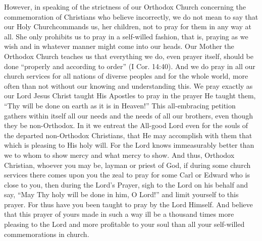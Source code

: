 However, in speaking of the strictness of our Orthodox Church concerning the commemoration of Christians who believe incorrectly, we do not mean to say that our Holy Churchcommands us, her children, not to pray for them in any way at all. She only prohibits us to pray in a self-willed fashion, that is, praying as we wish and in whatever manner might come into our heads. Our Mother the Orthodox Church teaches us that everything we do, even prayer itself, should be done ``properly and according to order'' (I Cor. 14:40). And we do pray in all our church services for all nations of diverse peoples and for the whole world, more often than not without our knowing and understanding this. We pray exactly as our Lord Jesus Christ taught His Apostles to pray in the prayer He taught them, ``Thy will be done on earth as it is in Heaven!'' This all-embracing petition gathers within itself all our needs and the needs of all our brothers, even though they be non-Orthodox. In it we entreat the All-good Lord even for the souls of the departed non-Orthodox Christians, that He may accomplish with them that which is pleasing to His holy will. For the Lord knows immeasurably better than we to whom to show mercy and what mercy to show. And thus, Orthodox Christian, whoever you may be, layman or priest of God, if during some church services there comes upon you the zeal to pray for some Carl or Edward who is close to you, then during the Lord's Prayer, sigh to the Lord on his behalf and say, ``May Thy holy will be done in him, O Lord!'' and limit yourself to this prayer. For thus have you been taught to pray by the Lord Himself. And believe that this prayer of yours made in such a way ill be a thousand times more pleasing to the Lord and more profitable to your soul than all your self-willed commemorations in church.

